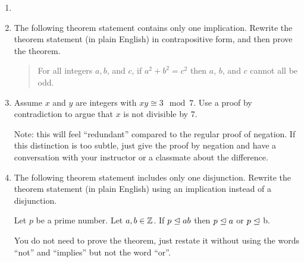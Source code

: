  \begin{xca}
 	
 \begin{enumerate}
 	\item[]
 	\item 	 The following theorem statement contains only one implication.  Rewrite the theorem statement (in plain English) in contrapositive form, and then prove the theorem.
 	
 	\begin{quote}
 		For all integers $a,b$, and $c$, if $a^2+b^2 = c^2$ then $a$, $b$, and $c$ cannot all be odd.
 	\end{quote}
 
\item Assume $x$ and $y$ are integers with $xy \cong 3 \mod 7$.  Use a proof by contradiction to argue that $x$ is not divisible by $7$.

Note:  this will feel ``redundant'' compared to the regular proof of negation.  If this distinction is too subtle, just give the proof by negation and have a conversation with your instructor or a classmate about the difference.

\item The following theorem statement includes only one disjunction.  Rewrite the theorem statement (in plain English) using an implication instead of a disjunction.

\begin{theorem}
	Let $p$ be a prime number.  Let $a,b \in \mathbb{Z}$.  If $p \trianglelefteq ab$ then $p \trianglelefteq a$ or $p \trianglelefteq$ b.
	\end{theorem}

You do not need to prove the theorem, just restate it without using the words ``not'' and ``implies'' but not the word ``or''.

 	\end{enumerate}
 	\end{xca}